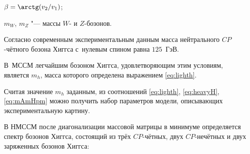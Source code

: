 $\beta=\arctg ({v_2}/{v_1})$; %

$m_{W}$, $m_{Z}$ "--- массы $W$- и $Z$-бозонов.



Согласно современным экспериментальным данным масса нейтрального $CP$-чётного бозона Хиггса с~нулевым спином равна $125$~ГэВ. 

В~МССМ легчайшим бозоном Хиггса, удовлетворяющим этим условиям, является $m_h$, масса которого определена выражением \eqref{eq:lighth}. 

Считая значение $m_h$ заданным, из соотношений \eqref{eq:lighth}, \eqref{eq:heavyH}, \eqref{eq:mAmHpm} можно получить набор параметров модели, описывающих экспериментальную картину.  














В НМССМ после диагонализации массовой матрицы в минимуме определяется спектр бозонов Хиггса, состоящий из трёх $CP$-чётных, двух $CP$-нечётных и двух заряженных бозонов Хиггса:

